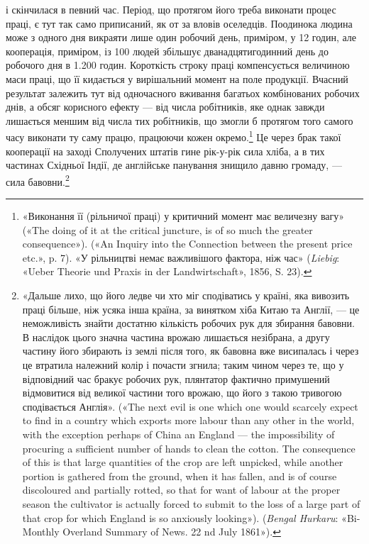 \parcont{}  %
і скінчилася в певний час. Період, що протягом його треба виконати
процес праці, є тут так само приписаний, як от за вловів
оселедців. Поодинока людина може з одного дня викраяти лише
один робочий день, приміром, у 12 годин, але кооперація, приміром,
із 100 людей збільшує дванадцятигодинний день до робочого
дня в \num{1.200} годин. Короткість строку праці компенсується
величиною маси праці, що її кидається у вирішальний момент
на поле продукції. Вчасний результат залежить тут від одночасного
вживання багатьох комбінованих робочих днів, а обсяг
корисного ефекту — від числа робітників, яке однак завжди
лишається меншим від числа тих робітників, що змогли б протягом
того самого часу виконати ту саму працю, працюючи кожен
окремо.\footnote{
«Виконання її (рільничої праці) у критичний момент має величезну
вагу» («The doing of it at the critical juncture, is of so much the
greater consequence»). («An Inquiry into the Connection between the present
price etc.», p. 7). «У рільництві немає важливішого фактора, ніж час»
(\emph{Liebig}: «Ueber Theorie und Praxis in der Landwirtschaft», 1856, S. 23).
} Це через брак такої кооперації на заході Сполучених
штатів гине рік-у-рік сила хліба, а в тих частинах Східньої
Індії, де англійське панування знищило давню громаду, — сила
бавовни.\footnote{
«Дальше лихо, що його ледве чи хто міг сподіватись у країні,
яка вивозить праці більше, ніж усяка інша країна, за винятком хіба
Китаю та Англії, — це неможливість знайти достатню кількість робочих
рук для збирання бавовни. В наслідок цього значна частина врожаю лишається
незібрана, а другу частину його збирають із землі після того, як
бавовна вже висипалась і через це втратила належний колір і почасти
згнила; таким чином через те, що у відповідний час бракує робочих рук,
плянтатор фактично примушений відмовитися від великої частини того
врожаю, що його з такою тривогою сподівається Англія». («The next
evil is one which one would scarcely expect to find in a country which exports
more labour than any other in the world, with the exception perhaps of
China an England — the impossibility of procuring a sufficient number of
hands to clean the cotton. The consequence of this is that large quantities of
the crop are left unpicked, while another portion is gathered from the ground,
when it has fallen, and is of course discoloured and partially rotted, so
that for want of labour at the proper season the cultivator is actually forced
to submit to the loss of a large part of that crop for which England is so
anxiously looking»). (\emph{Bengal Hurkaru}: «Bi-Monthly Overland Summary
of News. 22 nd July 1861»).
}

